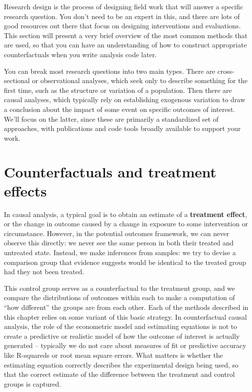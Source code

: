 
\begin{fullwidth}
Research design is the process of designing field work
that will answer a specific research question.
You don't need to be an expert in this,
and there are lots of good resources out there
that focus on designing interventions and evaluations.
This section will present a very brief overview
of the most common methods that are used,
so that you can have an understanding of
how to construct appropriate counterfactuals
when you write analysis code later.

You can break most research questions into two main types.
There are cross-sectional or observational analyses,
which seek only to describe something for the first time,
such as the structure or variation of a population.
Then there are causal analyses,
which typically rely on establishing exogenous variation
to draw a conclusion about the impact of some event
on specific outcomes of interest.
We'll focus on the latter, since these are primarily
a standardized set of approaches, with publications
and code tools broadly available to support your work.
\end{fullwidth}


\section{Counterfactuals and treatment effects}

In causal analysis, a typical goal is to obtain an estimate
of a \textbf{treatment effect}, or the change in outcome
caused by a change in exposure to some intervention or circumstance.
However, in the potential outcomes framework,
we can never observe this directly:
we never see the same person in both their treated and untreated state.
Instead, we make inferences from samples:
we try to devise a comparison group that evidence suggests
would be identical to the treated group had they not been treated.

This control group serves as a counterfactual to the treatment group,
and we compare the distributions of outcomes within each
to make a computation of ``how different'' the groups are from each other.
Each of the methods described in this chapter
relies on some variant of this basic strategy.
In counterfactual causal analysis,
the role of the econometric model and estimating equations
is not to create a predictive or realistic model
of how the outcome of interest is actually generated --
typically we do not care about measures of fit or predictive accuracy
like R-squareds or root mean square errors.
What matters is whether the estimating equation
correctly describes the experimental design being used,
so that the correct estimate of the difference
between the treatment and control groups is captured.

